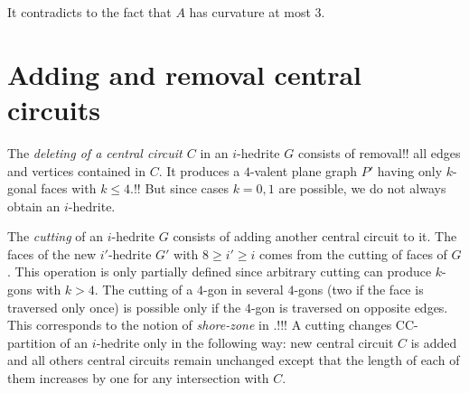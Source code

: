 \documentclass[12pt]{article}
\begin{document}
It contradicts to the fact that $A$ has curvature at most $3$. 








\section{Adding and removal central circuits}


%
%
%
%
%


The {\em deleting of a central circuit $C$} in an $i$-hedrite $G$ consists 
of removal!! all edges and vertices contained in $C$. It produces a 
$4$-valent plane graph $P'$ having only $k$-gonal faces 
with $k \leq 4$.!! But since cases $k=0,1$ are possible, we do not
always obtain an $i$-hedrite.


The {\em cutting} of an $i$-hedrite $G$ consists of adding another central 
circuit to it. The faces of the new $i'$-hedrite $G'$ with $8\geq i'\geq i$ 
comes from the cutting of faces of $G$. This operation is only partially
defined since arbitrary cutting can produce $k$-gons with $k>4$. The 
cutting of a $4$-gon in several $4$-gons (two if the face
is traversed only once) is possible only if the $4$-gon is traversed 
on opposite edges. This corresponds to the notion of {\it shore-zone} 
in \cite{DSt}.!!!
A cutting changes CC-partition of an $i$-hedrite only in the following 
way: new central circuit $C$ is added and all others central circuits 
remain unchanged except that the length of each of them increases by one 
for any intersection with $C$. 
\end{document}
